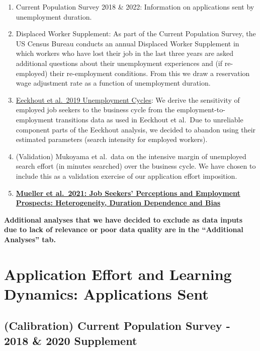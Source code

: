 \documentclass[
]{article}
\begin{document}
\begin{enumerate}
\def\labelenumi{\arabic{enumi}.}
\item
  Current Population Survey 2018 \& 2022: Information on applications
  sent by unemployment duration.
\item
  Displaced Worker Supplement: As part of the Current Population Survey,
  the US Census Bureau conducts an annual Displaced Worker Supplement in
  which workers who have lost their job in the last three years are
  asked additional questions about their unemployment experiences and
  (if re-employed) their re-employment conditions. From this we draw a
  reservation wage adjustment rate as a function of unemployment
  duration.
\item
  \href{https://www.aeaweb.org/articles?id=10.1257/mac.20180105}{Eeckhout
  et al.~2019 Unemployment Cycles}: We derive the sensitivity of
  employed job seekers to the business cycle from the
  employment-to-employment transitions data as used in Eeckhout et
  al.~Due to unreliable component parts of the Eeckhout analysis, we
  decided to abandon using their estimated parameters (search intensity
  for employed workers).
\item
  (Validation) Mukoyama et al.~data on the intensive margin of
  unemployed search effort (in minutes searched) over the business
  cycle. We have chosen to include this as a validation exercise of our
  application effort imposition.
\item
  \href{https://www.aeaweb.org/articles?id=10.1257/aer.20190808}{\textbf{Mueller
  et al.~2021: Job Seekers' Perceptions and Employment Prospects:
  Heterogeneity, Duration Dependence and Bias}}
\end{enumerate}

\textbf{Additional analyses that we have decided to exclude as data
inputs due to lack of relevance or poor data quality are in the
``Additional Analyses'' tab.}

\section{Application Effort and Learning Dynamics: Applications
Sent}\label{application-effort-and-learning-dynamics-applications-sent}

\subsection{(Calibration) Current Population Survey - 2018 \& 2020
Supplement}\label{calibration-current-population-survey---2018-2020-supplement}
\end{document}
